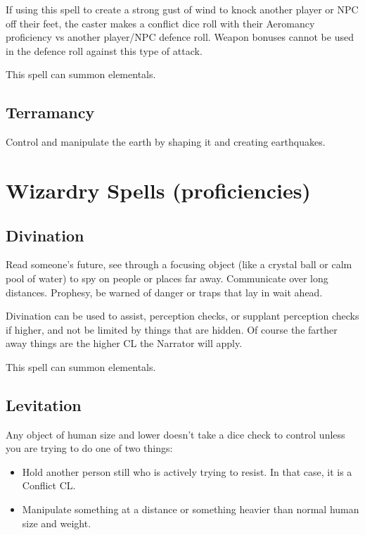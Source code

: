 If using this spell to create a strong gust of wind to knock another player or NPC off their feet, the caster makes a conflict dice roll with their Aeromancy proficiency vs another player/NPC defence roll. Weapon bonuses cannot be used in the defence roll against this type of attack.

This spell can summon elementals.

\subsection{Terramancy}

Control and manipulate the earth by shaping it and creating earthquakes.

\section{Wizardry Spells (proficiencies)}

\subsection{Divination}

Read someone’s future, see through a focusing object (like a crystal ball or calm pool of water) to spy on people or places far away. Communicate over long distances. Prophesy, be warned of danger or traps that lay in wait ahead.

Divination can be used to assist, perception checks, or supplant perception checks if higher, and not be limited by things that are hidden. Of course the farther away things are the higher CL the Narrator will apply.

This spell can summon elementals.

\subsection{Levitation}

Any object of human size and lower doesn’t take a dice check to control unless you are trying to do one of two things:

\begin{itemize}
    \item Hold another person still who is actively trying to resist. In that case, it is a Conflict CL.
    \item Manipulate something at a distance or something heavier than normal human size and weight.
\end{itemize}

